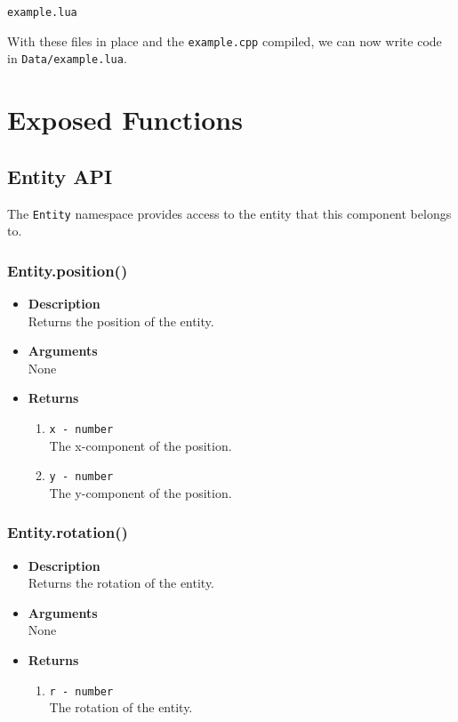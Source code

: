 \documentclass[12pt,a4paper]{article}
\begin{document}
\begin{lstlisting}[title=Data/res.list]
example.lua
\end{lstlisting}

With these files in place and the \texttt{example.cpp} compiled, we can now write code in \texttt{Data/example.lua}.

\pagebreak
\section{Exposed Functions}

\subsection{Entity API}

The \texttt{Entity} namespace provides access to the entity that this component belongs to. 

\subsubsection{Entity.position()}
\begin{itemize}
	\item[]{\bf Description}
		\\ Returns the position of the entity.
	\item[]{\bf Arguments}
		\\ None
	\item[]{\bf Returns}
		\begin{enumerate}
			\item{\texttt{x - number}} 
				\\ The x-component of the position.
			\item{\texttt{y - number}} 
				\\ The y-component of the position.
		\end{enumerate}
\end{itemize}

\subsubsection{Entity.rotation()}
\begin{itemize}
	\item[]{\bf Description}
		\\ Returns the rotation of the entity.
	\item[]{\bf Arguments}
		\\ None
	\item[]{\bf Returns}
		\begin{enumerate}
			\item{\texttt{r - number}} 
				\\ The rotation of the entity.
		\end{enumerate}
\end{itemize}
\end{document}
